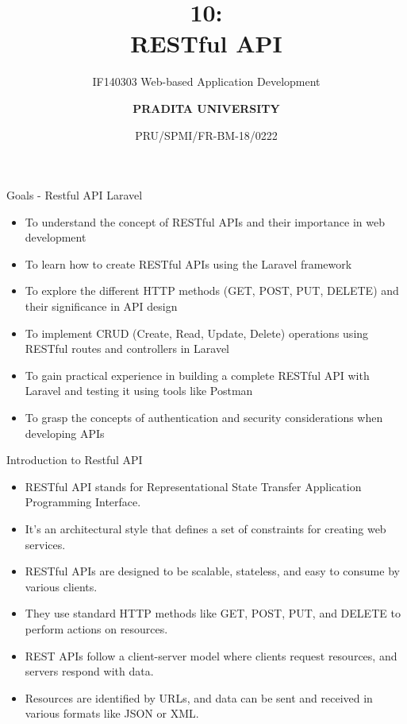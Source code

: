 \documentclass[aspectratio=169, table]{beamer}
\subtitle{IF140303 Web-based Application Development}
\title{\Huge {\textbf{10: \\RESTful API}}}
\date[Serial]{\scriptsize {PRU/SPMI/FR-BM-18/0222}}
\author[Pradita]{\small {\textbf{PRADITA UNIVERSITY}}}
\begin{document}
\begin{frame}
    \titlepage
\end{frame}

\begin{frame}{Goals - Restful API Laravel}
\vskip1cm
    \begin{itemize}
        \item To understand the concept of RESTful APIs and their importance in web development
        \item To learn how to create RESTful APIs using the Laravel framework
        \item To explore the different HTTP methods (GET, POST, PUT, DELETE) and their significance in API design
        \item To implement CRUD (Create, Read, Update, Delete) operations using RESTful routes and controllers in Laravel
        \item To gain practical experience in building a complete RESTful API with Laravel and testing it using tools like Postman
        \item To grasp the concepts of authentication and security considerations when developing APIs
    \end{itemize}
\end{frame}

\begin{frame}{Introduction to Restful API}
    \vskip1cm
    \begin{itemize}
        \item RESTful API stands for Representational State Transfer Application Programming Interface.
        \item It's an architectural style that defines a set of constraints for creating web services.
        \item RESTful APIs are designed to be scalable, stateless, and easy to consume by various clients.
        \item They use standard HTTP methods like GET, POST, PUT, and DELETE to perform actions on resources.
        \item REST APIs follow a client-server model where clients request resources, and servers respond with data.
        \item Resources are identified by URLs, and data can be sent and received in various formats like JSON or XML.
    \end{itemize}
\end{frame}
\end{document}
